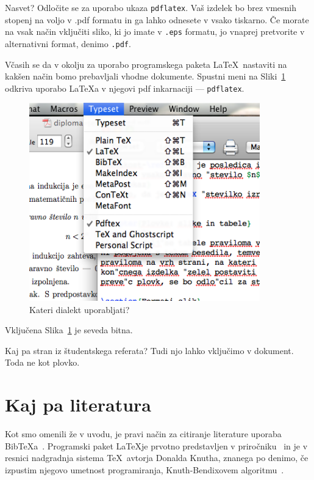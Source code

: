 \documentclass[oneside, a4paper, 12pt]{book}
\newcommand{\BibTeX}{{\sc Bib}\TeX}
\begin{document}
Nasvet? Odločite se za uporabo ukaza {\tt pdflatex}. Vaš izdelek bo brez vmesnih stopenj na voljo v {.pdf} formatu in ga lahko odnesete v vsako tiskarno. Če morate na vsak način vključiti sliko, ki jo imate v {\tt .eps} formatu, jo vnaprej pretvorite v alternativni format, denimo {\tt .pdf}.

Včasih se da v okolju za uporabo programskega paketa \LaTeX\ nastaviti na kakšen način bomo prebavljali vhodne dokumente. Spustni meni na Sliki~\ref{pic2} odkriva uporabo \LaTeX{}a v njegovi pdf inkarnaciji --- {\tt pdflatex}.
\begin{figure}
\begin{center}
\includegraphics[width=10cm]{pic2.png}
\end{center}
\caption{Kateri dialekt uporabljati?}
\label{pic2}
\end{figure} 

Vključena Slika~\ref{pic2} je seveda bitna.

Kaj pa stran iz študentskega referata?\label{pp}
Tudi njo lahko vključimo v dokument. Toda ne kot plovko.
 


\chapter{Kaj pa literatura}
\label{ch3}
Kot smo omenili že v uvodu, je pravi način za citiranje literature uporaba \BibTeX{}a~\cite{bib}. 
Programski paket \LaTeX je prvotno predstavljen v priročniku~\cite{lat} in je v resnici nadgradnja sistema \TeX\ avtorja Donalda Knutha, znanega po denimo, če izpustim njegovo umetnost programiranja, Knuth-Bendixovem algoritmu~\cite{dk1}.
\end{document}
